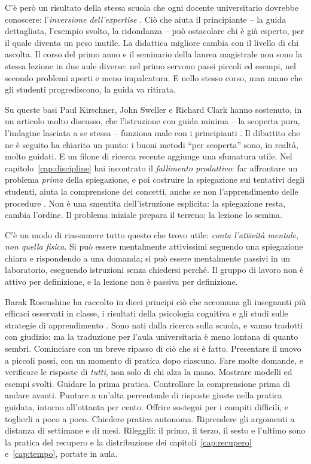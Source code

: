 C'è però un risultato della stessa scuola che ogni docente
universitario dovrebbe conoscere: l'\emph{inversione dell'expertise}
\parencite{kalyuga2003}. Ciò che aiuta il principiante -- la guida
dettagliata, l'esempio svolto, la ridondanza -- può ostacolare chi è
già esperto, per il quale diventa un peso inutile. La didattica
migliore cambia con il livello di chi ascolta. Il corso del primo
anno e il seminario della laurea magistrale non sono la stessa
lezione in due aule diverse: nel primo servono passi piccoli ed
esempi, nel secondo problemi aperti e meno impalcatura. E nello stesso
corso, man mano che gli studenti progrediscono, la guida va ritirata.

Su queste basi Paul Kirschner, John Sweller e Richard Clark hanno
sostenuto, in un articolo molto discusso, che l'istruzione con guida
minima -- la scoperta pura, l'indagine lasciata a se stessa -- funziona
male con i principianti \parencite{kirschner2006}. Il dibattito che ne
è seguito ha chiarito un punto: i buoni metodi \enquote{per scoperta}
sono, in realtà, molto guidati. E un filone di ricerca recente
aggiunge una sfumatura utile. Nel capitolo~\ref{cap:discipline} hai
incontrato il \emph{fallimento produttivo}: far affrontare un problema
\emph{prima} della spiegazione, e poi costruire la spiegazione sui
tentativi degli studenti, aiuta la comprensione dei concetti, anche se
non l'apprendimento delle procedure \parencite{sinha2021}. Non è una
smentita dell'istruzione esplicita: la spiegazione resta, cambia
l'ordine. Il problema iniziale prepara il terreno; la lezione lo
semina.

C'è un modo di riassumere tutto questo che trovo utile: \emph{conta
l'attività mentale, non quella fisica}. Si può essere mentalmente
attivissimi seguendo una spiegazione chiara e rispondendo a una
domanda; si può essere mentalmente passivi in un laboratorio, eseguendo
istruzioni senza chiedersi perché. Il gruppo di lavoro non è attivo
per definizione, e la lezione non è passiva per definizione.

Barak Rosenshine ha raccolto in dieci principi ciò che accomuna gli
insegnanti più efficaci osservati in classe, i risultati della
psicologia cognitiva e gli studi sulle strategie di apprendimento
\parencite{rosenshine2012}. Sono nati dalla ricerca sulla scuola, e
vanno tradotti con giudizio; ma la traduzione per l'aula universitaria
è meno lontana di quanto sembri. Cominciare con un breve ripasso di
ciò che si è fatto. Presentare il nuovo a piccoli passi, con un
momento di pratica dopo ciascuno. Fare molte domande, e verificare le
risposte di \emph{tutti}, non solo di chi alza la mano. Mostrare
modelli ed esempi svolti. Guidare la prima pratica. Controllare la
comprensione prima di andare avanti. Puntare a un'alta percentuale di
risposte giuste nella pratica guidata, intorno all'ottanta per cento.
Offrire sostegni per i compiti difficili, e toglierli a poco a poco.
Chiedere pratica autonoma. Riprendere gli argomenti a distanza di
settimane e di mesi. Rileggili: il primo, il terzo, il sesto e
l'ultimo sono la pratica del recupero e la distribuzione dei
capitoli~\ref{cap:recupero} e~\ref{cap:tempo}, portate in aula.

